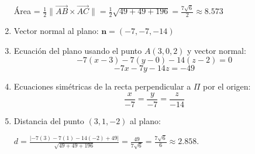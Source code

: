 \begin{prob}
\begin{myproof}
\begin{multicols}{2}
\begin{enumerate}[$(a)$]
Área = $\frac{1}{2}\|\overrightarrow{AB} \times \overrightarrow{AC}\| = \frac{1}{2}\sqrt{49 + 49 + 196} = \frac{7\sqrt{6}}{2} \approx 8.573$

\item Vector normal al plano: $\mathbf{n} = (-7, -7, -14)$

\item Ecuación del plano usando el punto $A(3,0,2)$ y vector normal:
$$-7(x - 3) - 7(y - 0) - 14(z - 2) = 0$$
$$-7x - 7y - 14z = -49$$

\item Ecuaciones simétricas de la recta perpendicular a $\Pi$ por el origen:
$$\frac{x}{-7} = \frac{y}{-7} = \frac{z}{-14}$$

\item Distancia del punto $(3,1,-2)$ al plano:


$d = \frac{|-7(3) - 7(1) - 14(-2) + 49|}{\sqrt{49 + 49 + 196}} = \frac{49}{7\sqrt{6}} = \frac{7\sqrt{6}}{6} \approx 2.858.$
\end{enumerate}
\end{multicols}
\end{myproof}
\end{prob}


